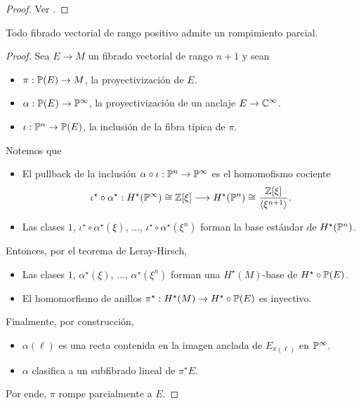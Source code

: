 \begin{proof}
Ver \cite[pp. 432-434]{hatcher1}.
\end{proof}

\begin{lemma}
Todo fibrado vectorial de rango positivo admite un rompimiento parcial.
\end{lemma}

\begin{proof}
Sea $E \to M$ un fibrado vectorial de rango $n+1$ y sean
\begin{itemize}
    \itemsep 0em
    \item $\pi : \P(E) \to M$, la proyectivización de $E$.
    \item $\alpha : \P(E) \to \P^\infty$, la proyectivización de un anclaje $E \to \C^\infty$.
    \item $\iota : \P^n \to \P(E)$, la inclusión de la fibra típica de $\pi$.
\end{itemize}
Notemos que
\begin{itemize}
    \itemsep 0em
    \item El pullback de la inclusión $\alpha \circ \iota : \P^n \to \P^\infty$ es el homomofismo cociente
    $$
    \iota^\star \circ \alpha^\star :
    H^\star(\P^\infty) \cong \Z[\xi] \longrightarrow
    H^\star(\P^n)      \cong \dfrac {\Z[\xi]} {\langle \xi^{n+1} \rangle}.
    $$
    
    \item Las clases $1$, $\iota^\star \circ \alpha^\star(\xi)$, $\dots$, $\iota^\star \circ \alpha^\star(\xi^n)$ forman la base estándar de $H^\star(\P^n)$.
\end{itemize}
Entonces, por el teorema de Leray-Hirsch,
\begin{itemize}
    \itemsep 0em
    \item Las clases $1$, $\alpha^\star(\xi)$, $\dots$, $\alpha^\star(\xi^n)$ forman una $H^\star(M)$-base de $H^\star \circ \P(E)$.
    \item El homomorfismo de anillos $\pi^\star : H^\star(M) \to H^\star \circ \P(E)$ es inyectivo.
\end{itemize}
Finalmente, por construcción,
\begin{itemize}
    \itemsep 0em
    \item $\alpha(\ell)$ es una recta contenida en la imagen anclada de $E_{\pi(\ell)}$ en $\P^\infty$.
    \item $\alpha$ clasifica a un subfibrado lineal de $\pi^\star E$.
\end{itemize}
Por ende, $\pi$ rompe parcialmente a $E$.
\end{proof}


